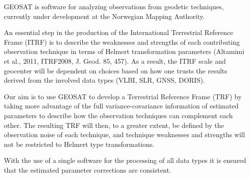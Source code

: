 GEOSAT is software for analyzing observations from geodetic
techniques, currently under development at the Norwegian Mapping
Authority.

An essential step in the production of the International Terrestrial
Reference Frame (ITRF) is to describe the weaknesses and strengths of
each contributing observation technique in terms of Helmert transformation parameters (Altamimi et al., 2011, ITRF2008, J. Geod. 85, 457). As a result, the ITRF
scale and geocenter will be dependent on choices based on how one
trusts the results derived from the involved data types (VLBI, SLR,
GNSS, DORIS).

Our aim is to use GEOSAT to develop a Terrestrial Reference Frame
(TRF) by taking more advantage of the full variance-covariance
information of estimated parameters to describe how the observation
techniques can complement each other. The resulting TRF will then, to
a greater extent, be defined by the observation noise of each
technique, and technique weaknesses and strengths will not be
restricted to Helmert type transformations.

With the use of a single software for the processing of all data types
it is ensured that the estimated parameter corrections are consistent.

\endinput
